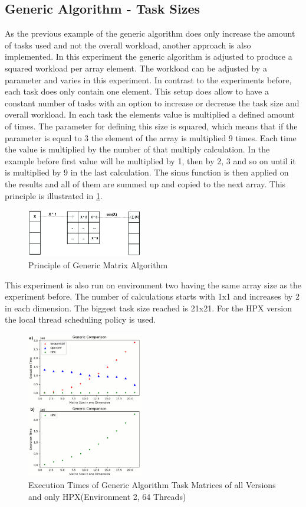 \subsection{Generic Algorithm - Task Sizes}
As the previous example of the generic algorithm does only increase the amount of tasks used and not the overall workload, another approach is also implemented.
In this experiment the generic algorithm is adjusted to produce a squared workload per array element.
The workload can be adjusted by a parameter and varies in this experiment.
In contrast to the experiments before, each task does only contain one element.
This setup does allow to have a constant number of tasks with an option to increase or decrease the task size and overall workload.
In each task the elements value is multiplied a defined amount of times.
The parameter for defining this size is squared, which means that if the parameter is equal to 3 the element of the array is multiplied 9 times.
Each time the value is multiplied by the number of that multiply calculation.
In the example before first value will be multiplied by 1, then by 2, 3 and so on until it is multiplied by 9 in the last calculation.
The sinus function is then applied on the results and all of them are summed up and copied to the next array.
This principle is illustrated in \ref{fig:genMatrix_algo}.
\begin{figure}[h]
	\centering
	\includegraphics[width=0.45\textwidth]{figures/genericMatrix_algo.png}
	\caption{Principle of Generic Matrix Algorithm}
	\label{fig:genMatrix_algo}
\end{figure}

This experiment is also run on environment two having the same array size as the experiment before.
The number of calculations starts with 1x1 and increases by 2 in each dimension.
The biggest task size reached is 21x21.
For the HPX version the local thread scheduling policy is used.
\begin{figure}[h]
	\centering
	\includegraphics[width=0.45\textwidth]{figures/genericMatrix.png}
	\caption{Execution Times of Generic Algorithm Task Matrices of all Versions and only HPX(Environment 2, 64 Threads)}
	\label{fig:genMatrix}
\end{figure}

